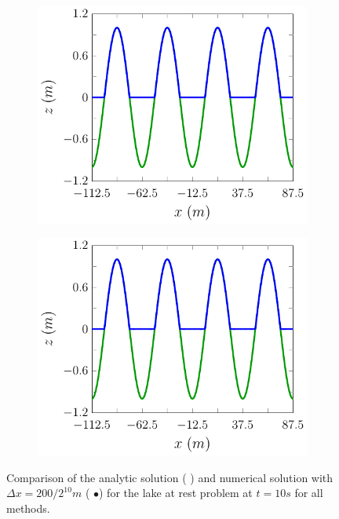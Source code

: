 \begin{figure}
\begin{subfigure}{0.5\textwidth}
		\vspace{0.5cm}
	\end{subfigure}
	\begin{subfigure}{0.5\textwidth}
		\includegraphics[width=\textwidth]{./chp5/figures/Analytic/LakeAtRest/Example/FDVMWB.pdf}
		\vspace{0.5cm}
	\end{subfigure}%
	\begin{subfigure}{0.5\textwidth}
		\includegraphics[width=\textwidth]{./chp5/figures/Analytic/LakeAtRest/Example/FDVMnWB.pdf}
		\vspace{0.5cm}
	\end{subfigure}
	\caption{Comparison of the analytic solution ({\color{blue} \solidrule}) and numerical solution with $\Delta x = {200} / {2^{10}}m$ ({\color{red} $\bullet$}) for the lake at rest problem at $t=10s$ for all methods.}
	\label{fig:LakeAtRestEx}
\end{figure}

